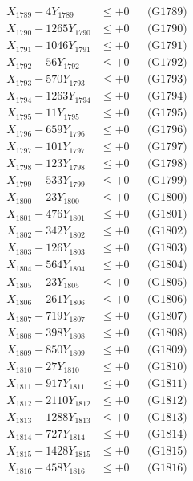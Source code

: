 \documentclass[a4paper,10pt]{article}
\begin{document}
{\begin{align}
X_{1789} - 4Y_{1789} &\leq +0 && \text{(G1789)} \\
X_{1790} - 1265Y_{1790} &\leq +0 && \text{(G1790)} \\
\allowbreak
X_{1791} - 1046Y_{1791} &\leq +0 && \text{(G1791)} \\
X_{1792} - 56Y_{1792} &\leq +0 && \text{(G1792)} \\
X_{1793} - 570Y_{1793} &\leq +0 && \text{(G1793)} \\
X_{1794} - 1263Y_{1794} &\leq +0 && \text{(G1794)} \\
X_{1795} - 11Y_{1795} &\leq +0 && \text{(G1795)} \\
X_{1796} - 659Y_{1796} &\leq +0 && \text{(G1796)} \\
X_{1797} - 101Y_{1797} &\leq +0 && \text{(G1797)} \\
X_{1798} - 123Y_{1798} &\leq +0 && \text{(G1798)} \\
X_{1799} - 533Y_{1799} &\leq +0 && \text{(G1799)} \\
X_{1800} - 23Y_{1800} &\leq +0 && \text{(G1800)} \\
\allowbreak
X_{1801} - 476Y_{1801} &\leq +0 && \text{(G1801)} \\
X_{1802} - 342Y_{1802} &\leq +0 && \text{(G1802)} \\
X_{1803} - 126Y_{1803} &\leq +0 && \text{(G1803)} \\
X_{1804} - 564Y_{1804} &\leq +0 && \text{(G1804)} \\
X_{1805} - 23Y_{1805} &\leq +0 && \text{(G1805)} \\
X_{1806} - 261Y_{1806} &\leq +0 && \text{(G1806)} \\
X_{1807} - 719Y_{1807} &\leq +0 && \text{(G1807)} \\
X_{1808} - 398Y_{1808} &\leq +0 && \text{(G1808)} \\
X_{1809} - 850Y_{1809} &\leq +0 && \text{(G1809)} \\
X_{1810} - 27Y_{1810} &\leq +0 && \text{(G1810)} \\
\allowbreak
X_{1811} - 917Y_{1811} &\leq +0 && \text{(G1811)} \\
X_{1812} - 2110Y_{1812} &\leq +0 && \text{(G1812)} \\
X_{1813} - 1288Y_{1813} &\leq +0 && \text{(G1813)} \\
X_{1814} - 727Y_{1814} &\leq +0 && \text{(G1814)} \\
X_{1815} - 1428Y_{1815} &\leq +0 && \text{(G1815)} \\
X_{1816} - 458Y_{1816} &\leq +0 && \text{(G1816)} \\

\end{align}}
\end{document}
